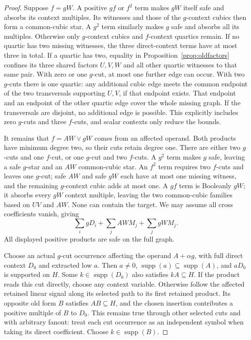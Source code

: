 \documentclass[11pt]{article}
\newcommand{\supp}{\operatorname{supp}}
\theoremstyle{definition}
\theoremstyle{remark}
\begin{document}
\begin{proof}
Suppose $f=gW$. A positive $gf$ or $f^2$ term makes $gW$ itself safe and absorbs its context multiples. Its witnesses and those of the $g$-context cubics then form a common-cubic star. A $g^2$ term similarly makes $g$ safe and absorbs all its multiples. Otherwise only $g$-context cubics and $f$-context quartics remain. If no quartic has two missing witnesses, the three direct-context terms have at most three in total. If a quartic has two, equality in Proposition~\ref{prop:oldfactors} confines its three shared factors $U,V,W$ and all other quartic witnesses to that same pair. With zero or one $g$-cut, at most one further edge can occur. With two $g$-cuts there is one quartic: any additional cubic edge meets the common endpoint of the two transversals supporting $U,V$, if that endpoint exists. That endpoint and an endpoint of the other quartic edge cover the whole missing graph. If the transversals are disjoint, no additional edge is possible. This explicitly includes zero $g$-cuts and three $f$-cuts, and scalar contexts only reduce the bounds.

It remains that $f=AW\vee gW$ comes from an affected operand. Both products have minimum degree two, so their cuts retain degree one. There are either two $g$-cuts and one $f$-cut, or one $g$-cut and two $f$-cuts. A $g^2$ term makes $g$ safe, leaving a safe $g$-star and an $AW$ common-cubic star. An $f^2$ term requires two $f$-cuts and leaves one $g$-cut; safe $AW$ and safe $gW$ each have at most one missing witness, and the remaining $g$-context cubic adds at most one. A $gf$ term is Booleanly $gW$; it absorbs every $gW$ context multiple, leaving the two common-cubic families based on $UV$ and $AW$. None can contain the target. We may assume all cross coefficients vanish, giving
\[
 \sum_i gD_i+\sum_j AWM_j+\sum_j gWM_j.
\]
All displayed positive products are safe on the full graph.

Choose an actual $g$-cut occurrence affecting the operand $A+\alpha g$, with full direct context $D_0$ and extracted low $a$. Then $a\ne0$, $\supp(a)\subseteq\supp(A)$, and $aD_0$ is supported on $H$. Some $k\in\supp(D_0)$ also satisfies $kA\subseteq H$. If the product reads this cut directly, choose any context variable. Otherwise follow the affected retained linear signal along its selected path to its first retained product. Its opposite old form $B$ satisfies $AB\subseteq H$, and the chosen insertion contributes a positive multiple of $B$ to $D_0$. This remains true through other selected cuts and with arbitrary fanout: treat each cut occurrence as an independent symbol when taking its direct coefficient. Choose $k\in\supp(B)$.


\end{proof}
\end{document}
